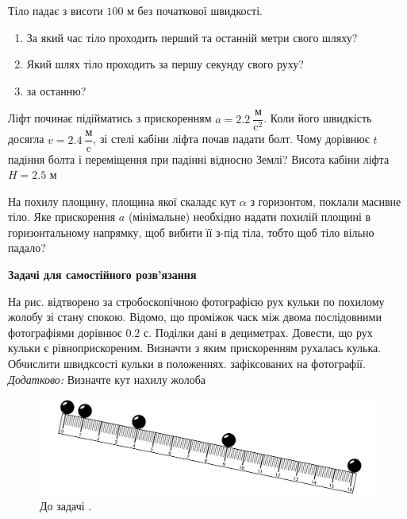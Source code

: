 \begin{problem}{5}
	Тіло падає з висоти $100$ м без початкової швидкості.
	\begin{enumerate}
		\item За який час тіло проходить перший та останній метри свого шляху?
		\item Який шлях тіло проходить за першу секунду свого руху?
		\item за останню?
	\end{enumerate}

\end{problem}
\begin{problem}{7}
	Ліфт починає підійматись з прискоренням $a = 2.2 ~\dfrac{\text{м}}{\text{c}^2}$. Коли його швидкість досягла $v = 2.4 ~\dfrac{\text{м}}{\text{c}}$, зі стелі кабіни ліфта почав падати болт. Чому  дорівнює $t$ падіння болта і переміщення при падінні відносно Землі? Висота кабіни ліфта $H = 2.5$ м
\end{problem}

\begin{problem}{8}
	На похилу площину, площина якої скаладє кут $\alpha$ з горизонтом, поклали масивне тіло. Яке прискорення $a$ (мінімальне) необхідно надати похилій площині в горизонтальному напрямку, щоб вибити її з-під тіла, тобто щоб тіло вільно падало?
\end{problem}
\textbf{Задачі для самостійного розв'язання}

\begin{problem}{4}
	На рис.  відтворено за стробоскопічною фотографією рух кульки по похилому жолобу зі стану спокою. Відомо, що проміжок часк між двома послідовними фотографіями дорівнює $0.2$ с. Поділки дані в дециметрах. Довести, що рух кульки є рівноприскореним. Визначти з яким прискоренням рухалась кулька. Обчислити швидксості кульки в положеннях. зафіксованих на фотографії. \textit{Додатково:} Визначте кут нахилу жолоба
	
	\begin{figure}[h!]
		\centering
		\includegraphics[width=0.5\linewidth]{class2/stroboskop}
		\caption{До задачі .}
		\label{fig:stroboskop}
	\end{figure}
	
\end{problem}

